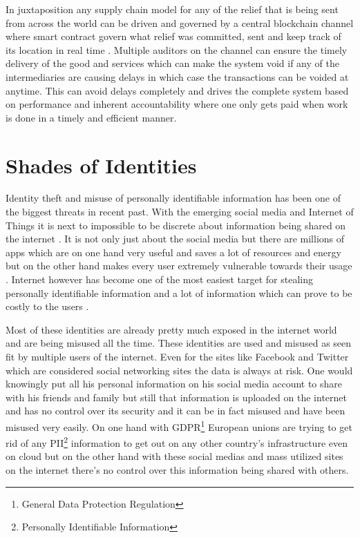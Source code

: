 In juxtaposition any supply chain model for any of the relief that is being sent from across the world can be driven and governed by a central blockchain channel where smart contract govern what relief was committed, sent and keep track of its location in real time \cite{christ19}. Multiple auditors on the channel can ensure the timely delivery of the good and services which can make the system void if any of the intermediaries are causing delays in which case the transactions can be voided at anytime. This can avoid delays completely and drives the complete system based on performance and inherent accountability where one only gets paid  when work is done in a timely and efficient manner.

\section{Shades of Identities}
Identity theft and misuse of personally identifiable information has been one of the biggest threats in recent past. With the emerging social media and Internet of Things it is next to impossible to be discrete about information being shared on the internet \cite{reuters20}. It is not only just about the social media but there are millions of apps which are on one hand very useful and saves a lot of resources and energy but on the other hand makes every user extremely vulnerable towards their usage \cite{statista21}. Internet however has become one of the most easiest target for stealing personally identifiable information and a lot of information which can prove to be costly to the users \cite{hedayati22}.

Most of these identities are already pretty much exposed in the internet world and are being misused all the time. These identities are used and misused as seen fit by multiple users of the internet. Even for the sites like Facebook and Twitter which are considered social networking sites the data is always at risk. One would knowingly put all his personal information on his social media account to share with his friends and family but still that information is uploaded on the internet and has no control over its security and it can be in fact misused and have been misused very easily. On one hand with GDPR\footnote{General Data Protection Regulation} European unions are trying to get rid of any PII\footnote{Personally Identifiable Information} information to get out on any other country's infrastructure even on cloud but on the other hand with these social medias and mass utilized sites on the internet there's no control over this information being shared with others.


